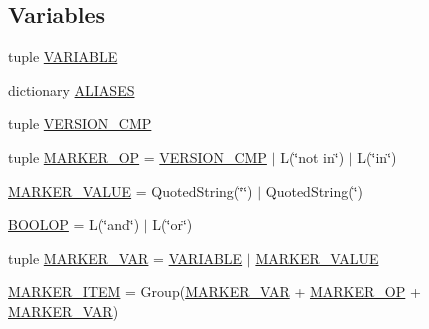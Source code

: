 \subsection*{Variables}
\begin{DoxyCompactItemize}
\item 
tuple \hyperlink{namespacepkg__resources_1_1__vendor_1_1packaging_1_1markers_a6b900d33a91c2cc51bcbedabf66efccc}{V\+A\+R\+I\+A\+B\+LE}
\item 
dictionary \hyperlink{namespacepkg__resources_1_1__vendor_1_1packaging_1_1markers_a84d0d24c5030d10b48dfc81a85d98e65}{A\+L\+I\+A\+S\+ES}
\item 
tuple \hyperlink{namespacepkg__resources_1_1__vendor_1_1packaging_1_1markers_a45b81eb5b2865f57ac4b28aa1bb9289a}{V\+E\+R\+S\+I\+O\+N\+\_\+\+C\+MP}
\item 
tuple \hyperlink{namespacepkg__resources_1_1__vendor_1_1packaging_1_1markers_a47efe0b858bbbb256f2a8b8d255d9ae3}{M\+A\+R\+K\+E\+R\+\_\+\+OP} = \hyperlink{namespacepkg__resources_1_1__vendor_1_1packaging_1_1markers_a45b81eb5b2865f57ac4b28aa1bb9289a}{V\+E\+R\+S\+I\+O\+N\+\_\+\+C\+MP} $\vert$ L(\char`\"{}not in\char`\"{}) $\vert$ L(\char`\"{}in\char`\"{})
\item 
\hyperlink{namespacepkg__resources_1_1__vendor_1_1packaging_1_1markers_aa1deaf915ea12a7e1de962f62fac4019}{M\+A\+R\+K\+E\+R\+\_\+\+V\+A\+L\+UE} = Quoted\+String(\char`\"{}\textquotesingle{}\char`\"{}) $\vert$ Quoted\+String(\textquotesingle{}\char`\"{}\textquotesingle{})
\item 
\hyperlink{namespacepkg__resources_1_1__vendor_1_1packaging_1_1markers_a9098646f0518fce97c7395c87d0fcb1c}{B\+O\+O\+L\+OP} = L(\char`\"{}and\char`\"{}) $\vert$ L(\char`\"{}or\char`\"{})
\item 
tuple \hyperlink{namespacepkg__resources_1_1__vendor_1_1packaging_1_1markers_a8ee0e1f56c9ec27fe24ab796cd4d3d27}{M\+A\+R\+K\+E\+R\+\_\+\+V\+AR} = \hyperlink{namespacepkg__resources_1_1__vendor_1_1packaging_1_1markers_a6b900d33a91c2cc51bcbedabf66efccc}{V\+A\+R\+I\+A\+B\+LE} $\vert$ \hyperlink{namespacepkg__resources_1_1__vendor_1_1packaging_1_1markers_aa1deaf915ea12a7e1de962f62fac4019}{M\+A\+R\+K\+E\+R\+\_\+\+V\+A\+L\+UE}
\item 
\hyperlink{namespacepkg__resources_1_1__vendor_1_1packaging_1_1markers_a3bc10a62d60c2ff7909f82f01f639afd}{M\+A\+R\+K\+E\+R\+\_\+\+I\+T\+EM} = Group(\hyperlink{namespacepkg__resources_1_1__vendor_1_1packaging_1_1markers_a8ee0e1f56c9ec27fe24ab796cd4d3d27}{M\+A\+R\+K\+E\+R\+\_\+\+V\+AR} + \hyperlink{namespacepkg__resources_1_1__vendor_1_1packaging_1_1markers_a47efe0b858bbbb256f2a8b8d255d9ae3}{M\+A\+R\+K\+E\+R\+\_\+\+OP} + \hyperlink{namespacepkg__resources_1_1__vendor_1_1packaging_1_1markers_a8ee0e1f56c9ec27fe24ab796cd4d3d27}{M\+A\+R\+K\+E\+R\+\_\+\+V\+AR})

\end{DoxyCompactItemize}

